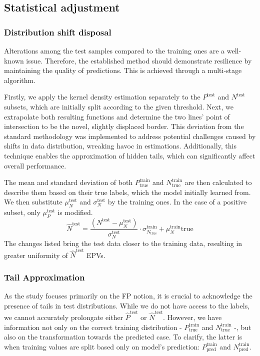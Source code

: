 \documentclass{article}
\begin{document}
\subsection{Statistical adjustment}\label{StatAd}

\subsubsection{Distribution shift disposal}

Alterations among the test samples compared to the training ones are a well-known issue. Therefore, the established method should demonstrate resilience by maintaining the quality of predictions. This is achieved through a multi-stage algorithm.

Firstly, we apply the kernel density estimation separately to the $P^{\text{test}}$ and $N^{\text{test}}$ subsets, which are initially split according to the given threshold. Next, we extrapolate both resulting functions and determine the two lines' point of intersection to be the novel, slightly displaced border. This deviation from the standard methodology was implemented to address potential challenges caused by shifts in data distribution, wreaking havoc in estimations. Additionally, this technique enables the approximation of hidden tails, which can significantly affect overall performance. 

The mean and standard deviation of both $P^{\text{train}}_{\text{true}}$ and $N^{\text{train}}_{\text{true}}$ are then calculated to describe them based on their true labels, which the model initially learned from. We then substitute $\mu^{\text{test}}_N$ and $\sigma^{\text{test}}_N$ by the training ones. In the case of a positive subset, only $\mu^{\text{test}}_P$ is modified.
    \begin{equation}
            \hat{N}^{\text{test}} = \frac{(N^{\text{test}} - \mu^{\text{test}}_N)}{\sigma^{\text{test}}_N} \cdot \sigma^{\text{train}}_{N_{\text{true}}} + \mu^{\text{train}}_N{\text{true}}
    \end{equation}
The changes listed bring the test data closer to the training data, resulting in greater uniformity  of $\hat{N}^{\text{test}}$ EPVs.



\subsubsection{Tail Approximation}

As the study focuses primarily on the FP notion, it is crucial to acknowledge the presence of tails in test distributions. While we do not have access to the labels, we cannot accurately prolongate either $\hat{P}^{\text{test}}$ or $ \hat{N}^{\text{test}}$. However, we have information not only on the correct training distribution - $P^{\text{train}}_{\text{true}}$ and $N^{\text{train}}_{\text{true}}$ -, but also on the transformation towards the predicted case. To clarify, the latter is when training values are split based only on model's prediction: $P^{\text{train}}_{\text{pred}}$ and $N^{\text{train}}_{\text{pred}}$. 
\end{document}

